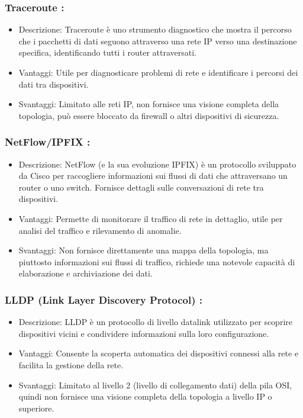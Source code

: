 \documentclass[target=bach,aauheader=,style=]{thud}
\begin{document}
\subsubsection{Traceroute \cite{netbrain_traceroute}:}
    \begin{itemize}
      \item Descrizione: Traceroute è uno strumento diagnostico che mostra il percorso che i pacchetti di dati seguono attraverso una rete IP verso una destinazione specifica, identificando tutti i router attraversati.
      \item Vantaggi: Utile per diagnosticare problemi di rete e identificare i percorsi dei dati tra dispositivi.
      \item Svantaggi: Limitato alle reti IP, non fornisce una visione completa della topologia, può essere bloccato da firewall o altri dispositivi di sicurezza.
    \end{itemize}

\subsubsection{NetFlow/IPFIX \cite{rfc7011}:}
    \begin{itemize}
      \item Descrizione: NetFlow (e la sua evoluzione IPFIX) è un protocollo sviluppato da Cisco per raccogliere informazioni sui flussi di dati che attraversano un router o uno switch. Fornisce dettagli sulle conversazioni di rete tra dispositivi.
      \item Vantaggi: Permette di monitorare il traffico di rete in dettaglio, utile per analisi del traffico e rilevamento di anomalie.
      \item Svantaggi: Non fornisce direttamente una mappa della topologia, ma piuttosto informazioni sui flussi di traffico, richiede una notevole capacità di elaborazione e archiviazione dei dati.
    \end{itemize}

\subsubsection{LLDP (Link Layer Discovery Protocol) \cite{ieee_lldp}:}
    \begin{itemize}
      \item Descrizione: LLDP è un protocollo di livello datalink utilizzato per scoprire dispositivi vicini e condividere informazioni sulla loro configurazione.
      \item Vantaggi: Consente la scoperta automatica dei dispositivi connessi alla rete e facilita la gestione della rete.
      \item Svantaggi: Limitato al livello 2 (livello di collegamento dati) della pila OSI, quindi non fornisce una visione completa della topologia a livello IP o superiore.
    \end{itemize}
\end{document}
